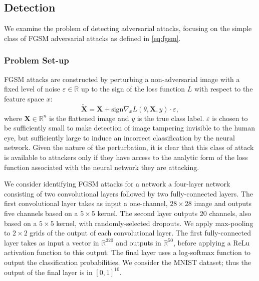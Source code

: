 \subsection{Detection}


We examine the problem of detecting adversarial attacks, focusing on the simple class of FGSM adversarial attacks as defined in \eqref{eq:fgsm}.

\subsubsection{Problem Set-up}\label{Setup}

FGSM attacks are constructed by perturbing a non-adversarial image with a fixed level of noise $\varepsilon \in \mathbb{R}$ up to the sign of the loss function $L$ with respect to the feature space $x$:
\begin{equation}
\mathbf{\tilde{X}}=\mathbf{X} + \text{sign}{\nabla_x L(\theta,\mathbf{X},y)}\cdot\varepsilon,
\end{equation}
where $\mathbf{X} \in \mathbb{R}^n$ is the flattened image and $y$ is the true class label. $\varepsilon$ is chosen to be sufficiently small to make detection of image tampering invisible to the human eye, but sufficiently large to induce an incorrect classification by the neural network. Given the nature of the perturbation, it is clear that this class of attack is available to attackers only if they have access to the analytic form of the loss function associated with the neural network they are attacking. 

\par 

We consider identifying FGSM attacks for a network a four-layer network consisting of two convolutional layers followed by two fully-connected layers. The first convolutional layer takes as input a one-channel, $28\times 28$ image and outputs five channels based on a $5\times 5$ kernel. The second layer outputs 20 channels, also based on a $5\times 5$ kernel, with randomly-selected dropouts. We apply max-pooling to $2\times 2$ grids of the output of each convolutional layer. The first fully-connected layer takes as input a vector in $\mathbb{R}^{320}$ and outputs in $\mathbb{R}^{50}$, before applying a ReLu activation function to this output. The final layer uses a log-softmax function to output the classification probabilities. We consider the MNIST dataset; thus the output of the final layer is in $[0,1]^{10}$.

